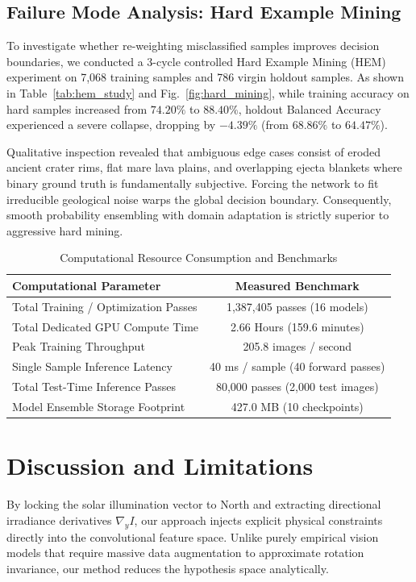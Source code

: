 \documentclass[10pt,journal,compsoc]{IEEEtran}
\theoremstyle{definition}
\begin{document}
\subsection{Failure Mode Analysis: Hard Example Mining}
To investigate whether re-weighting misclassified samples improves decision boundaries, we conducted a 3-cycle controlled Hard Example Mining (HEM) experiment on 7,068 training samples and 786 virgin holdout samples. As shown in Table~\ref{tab:hem_study} and Fig.~\ref{fig:hard_mining}, while training accuracy on hard samples increased from $74.20\%$ to $88.40\%$, holdout Balanced Accuracy experienced a severe collapse, dropping by $-4.39\%$ (from $68.86\%$ to $64.47\%$).

Qualitative inspection revealed that ambiguous edge cases consist of eroded ancient crater rims, flat mare lava plains, and overlapping ejecta blankets where binary ground truth is fundamentally subjective. Forcing the network to fit irreducible geological noise warps the global decision boundary. Consequently, smooth probability ensembling with domain adaptation is strictly superior to aggressive hard mining.

\begin{table}[t]
\centering
\caption{Computational Resource Consumption and Benchmarks}
\label{tab:compute}
\begin{tabular}{lc}
\toprule
\textbf{Computational Parameter} & \textbf{Measured Benchmark} \\
\midrule
Total Training / Optimization Passes & 1,387,405 passes (16 models) \\
Total Dedicated GPU Compute Time & 2.66 Hours (159.6 minutes) \\
Peak Training Throughput & 205.8 images / second \\
Single Sample Inference Latency & 40 ms / sample (40 forward passes) \\
Total Test-Time Inference Passes & 80,000 passes (2,000 test images) \\
Model Ensemble Storage Footprint & 427.0 MB (10 checkpoints) \\
\bottomrule
\end{tabular}
\end{table}

\section{Discussion and Limitations}
By locking the solar illumination vector to North and extracting directional irradiance derivatives $\nabla_y I$, our approach injects explicit physical constraints directly into the convolutional feature space. Unlike purely empirical vision models that require massive data augmentation to approximate rotation invariance, our method reduces the hypothesis space analytically.
\end{document}
